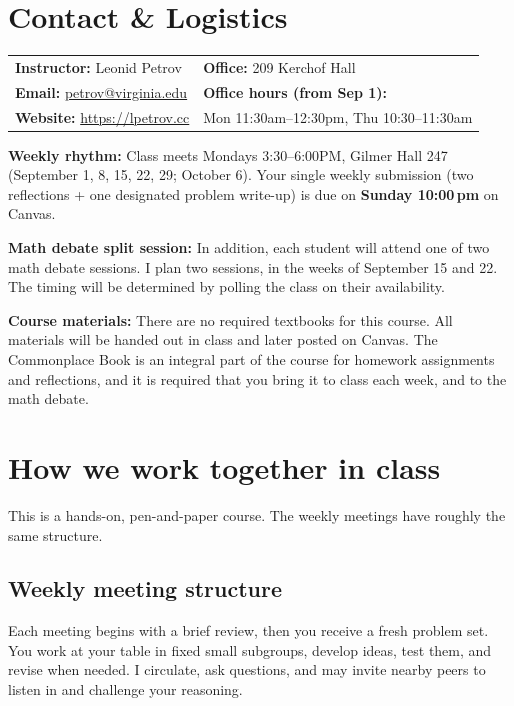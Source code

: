 \documentclass[oneside,11pt]{amsart}
\begin{document}
\newpage
\section{Contact \& Logistics}

\noindent
\begin{tabular}{ll}
\textbf{Instructor:} Leonid Petrov &\qquad \qquad \qquad\textbf{Office:} 209 Kerchof Hall \\
\textbf{Email:} \href{mailto:petrov@virginia.edu}{petrov@virginia.edu} & \qquad \qquad \qquad\textbf{Office hours (from Sep 1):} \\
\textbf{Website:} \url{https://lpetrov.cc}
& \qquad \qquad \qquad Mon 11:30am--12:30pm, Thu 10:30--11:30am
\end{tabular}

\smallskip
\noindent\textbf{Weekly rhythm:} Class meets Mondays
3:30--6:00PM, Gilmer Hall 247
(September 1, 8, 15, 22, 29; October 6).
Your single weekly submission (two reflections + one designated problem write-up) is due on \textbf{Sunday 10:00\,pm} on Canvas.

\smallskip
\noindent
\textbf{Math debate split session:}
In addition, each student will attend one of two math debate sessions. I plan two
sessions, in the weeks of September 15 and 22. The timing will be
determined by polling the class on their availability.

\smallskip
\noindent
\textbf{Course materials:}
There are no required textbooks for this course.
All materials will be handed out in class and later posted on Canvas.
The Commonplace Book is an integral part of the course for homework assignments and reflections,
and it is required that you bring it to class each week, and to the math debate.

\section{How we work together in class}

This is a hands-on, pen-and-paper course.
The weekly meetings have roughly the same structure.

\subsection{Weekly meeting structure}

Each meeting begins with
a brief review, then you receive
a fresh problem set. You work at your table in fixed small subgroups, develop ideas, test them, and revise when needed. I circulate, ask questions, and may invite nearby peers to listen in and
challenge your reasoning.
\end{document}
